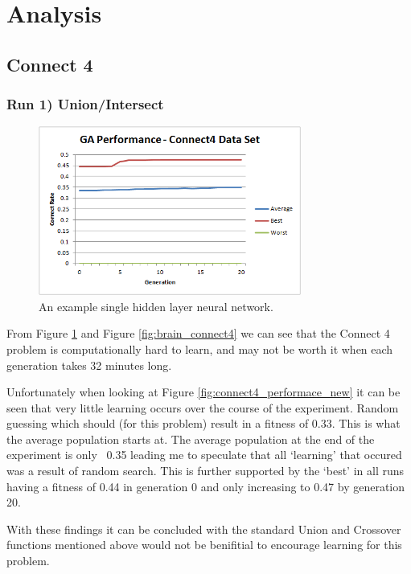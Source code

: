 \documentclass[journal]{IEEEtran}
\begin{document}
\section{Analysis}
  \subsection{Connect 4}
    \subsubsection*{Run 1) Union/Intersect}
      \begin{figure}[here]%
        \centering
        \includegraphics[width=3.4in]{connect4_performance_new}
        \caption{An example single hidden layer neural network.}
        \label{fig:connect4_performance_new}
      \end{figure}
      From Figure \ref{fig:connect4_performance_new} and Figure \ref{fig:brain_connect4}
      we can see that the Connect 4 problem is computationally hard to learn, and may not
    be worth it when each generation takes 32 minutes long.
      
      Unfortunately when looking at Figure \ref{fig:connect4_performace_new} it can be seen
    that very little learning occurs over the course of the experiment. Random guessing 
    which should (for this problem) result in a fitness of 0.33. This is what the average
    population starts at. The average population at the end of the experiment is only ~0.35
    leading me to speculate that all `learning' that occured was a result of random search.
    This is further supported by the `best' in all runs having a fitness of 0.44 in generation 0 and only
    increasing to 0.47 by generation 20.
    
    With these findings it can be concluded with the standard Union and Crossover functions
    mentioned above would not be benifitial to encourage learning for this problem.
    
\end{document}
